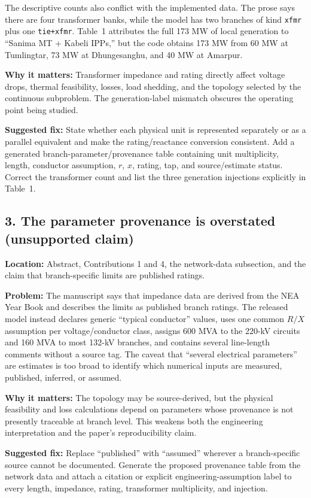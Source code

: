 \documentclass[11pt]{article}
\newcommand{\loc}[1]{\textbf{Location:} #1}
\newcommand{\problem}{\textbf{Problem:}}
\newcommand{\impact}{\textbf{Why it matters:}}
\newcommand{\fix}{\textbf{Suggested fix:}}
\begin{document}
The descriptive counts also conflict with the implemented data.  The prose
says there are four transformer banks, while the model has two branches of
kind \texttt{xfmr} plus one \texttt{tie+xfmr}.  Table~1 attributes the full
173 MW of local generation to ``Sanima MT + Kabeli IPPs,'' but the code obtains
173 MW from 60 MW at Tumlingtar, 73 MW at Dhungesanghu, and 40 MW at Amarpur.

\impact{} Transformer impedance and rating directly affect voltage drops,
thermal feasibility, losses, load shedding, and the topology selected by the
continuous subproblem.  The generation-label mismatch obscures the operating
point being studied.

\fix{} State whether each physical unit is represented separately or as a
parallel equivalent and make the rating/reactance conversion consistent.
Add a generated branch-parameter/provenance table containing unit multiplicity,
length, conductor assumption, $r$, $x$, rating, tap, and source/estimate status.
Correct the transformer count and list the three generation injections
explicitly in Table~1.

\subsection*{3. The parameter provenance is overstated (unsupported claim)}

\loc{Abstract, Contributions 1 and 4, the network-data subsection, and the
claim that branch-specific limits are published ratings.}

\problem{} The manuscript says that impedance data are derived from the NEA
Year Book and describes the limits as published branch ratings.  The released
model instead declares generic ``typical conductor'' values, uses one common
$R/X$ assumption per voltage/conductor class, assigns 600 MVA to the 220-kV
circuits and 160 MVA to most 132-kV branches, and contains several line-length
comments without a source tag.  The caveat that ``several electrical
parameters'' are estimates is too broad to identify which numerical inputs
are measured, published, inferred, or assumed.

\impact{} The topology may be source-derived, but the physical feasibility and
loss calculations depend on parameters whose provenance is not presently
traceable at branch level.  This weakens both the engineering interpretation
and the paper's reproducibility claim.

\fix{} Replace ``published'' with ``assumed'' wherever a branch-specific source
cannot be documented.  Generate the proposed provenance table from the network
data and attach a citation or explicit engineering-assumption label to every
length, impedance, rating, transformer multiplicity, and injection.
\end{document}
